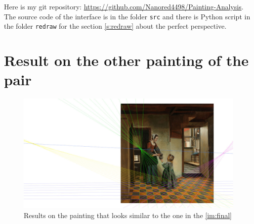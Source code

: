 \documentclass[11pt]{article}
\begin{document}
	Here is my git repository: \url{https://github.com/Nanored4498/Painting-Analysis}. The source code of the interface is in the folder \verb|src| and there is Python script in the folder \verb|redraw| for the section \ref{s:redraw} about the perfect perspective.
	
	\newpage
	\section{Result on the other painting of the pair}
	
	\begin{figure}[h]
		\centering
		\includegraphics[width=\linewidth]{final_bis.jpg}
		\caption{Results on the painting that looks similar to the one in the \figurename \ref{im:final}}
		\label{im:bis}
	\end{figure}
	
\end{document}
